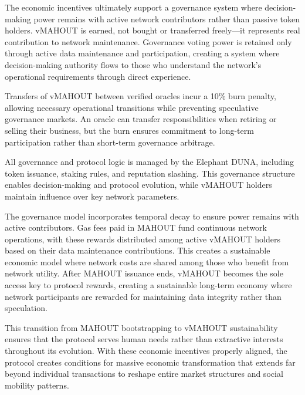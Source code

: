 The economic incentives ultimately support a governance system where decision-making power remains with active network contributors rather than passive token holders. vMAHOUT is earned, not bought or transferred freely---it represents real contribution to network maintenance. Governance voting power is retained only through active data maintenance and participation, creating a system where decision-making authority flows to those who understand the network's operational requirements through direct experience.

Transfers of vMAHOUT between verified oracles incur a 10\% burn penalty, allowing necessary operational transitions while preventing speculative governance markets. An oracle can transfer responsibilities when retiring or selling their business, but the burn ensures commitment to long-term participation rather than short-term governance arbitrage.

All governance and protocol logic is managed by the Elephant DUNA, including token issuance, staking rules, and reputation slashing. This governance structure enables decision-making and protocol evolution, while vMAHOUT holders maintain influence over key network parameters.

The governance model incorporates temporal decay to ensure power remains with active contributors. Gas fees paid in MAHOUT fund continuous network operations, with these rewards distributed among active vMAHOUT holders based on their data maintenance contributions. This creates a sustainable economic model where network costs are shared among those who benefit from network utility. After MAHOUT issuance ends, vMAHOUT becomes the sole access key to protocol rewards, creating a sustainable long-term economy where network participants are rewarded for maintaining data integrity rather than speculation.

This transition from MAHOUT bootstrapping to vMAHOUT sustainability ensures that the protocol serves human needs rather than extractive interests throughout its evolution. With these economic incentives properly aligned, the protocol creates conditions for massive economic transformation that extends far beyond individual transactions to reshape entire market structures and social mobility patterns.